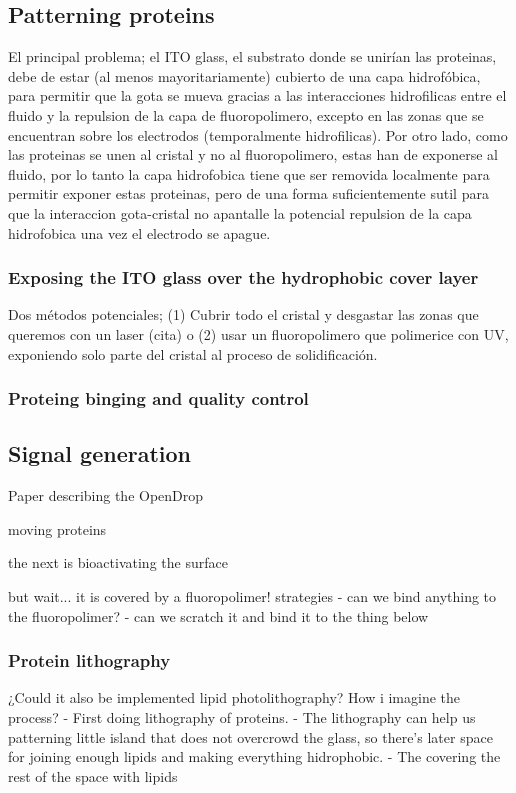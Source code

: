 \documentclass[12pt]{article}
\begin{document}
\subsection*{Patterning proteins}
El principal problema; el ITO glass, el substrato donde se unirían las proteinas, debe de estar (al menos mayoritariamente) cubierto de una capa hidrofóbica, para permitir que la gota se mueva gracias a las interacciones hidrofilicas entre el fluido y la repulsion de la capa de fluoropolimero, excepto en las zonas que se encuentran sobre los electrodos (temporalmente hidrofilicas). Por otro lado, como las proteinas se unen al cristal y no al fluoropolimero, estas han de exponerse al fluido, por lo tanto la capa hidrofobica tiene que ser removida localmente para permitir exponer estas proteinas, pero de una forma suficientemente sutil para que la interaccion gota-cristal no apantalle la potencial repulsion de la capa hidrofobica una vez el electrodo se apague.

\subsubsection*{Exposing the ITO glass over the hydrophobic cover layer}
Dos métodos potenciales; (1) Cubrir todo el cristal y desgastar las zonas que queremos con un laser (cita) o (2) usar un fluoropolimero que polimerice con UV, exponiendo solo parte del cristal al proceso de solidificación.
\subsubsection*{Proteing binging and quality control}
\subsection*{Signal generation}

Paper describing the OpenDrop

moving proteins

\cite{strale_multiprotein_2016}

the next is bioactivating the surface

but wait... it is covered by a fluoropolimer!
strategies
 - can we bind anything to the fluoropolimer?
  - can we scratch it and bind it to the thing below


\subsubsection*{Protein lithography}
¿Could it also be implemented lipid photolithography?
How i imagine the process?
 - First doing lithography of proteins. 
      - The lithography can help us patterning little island that does not overcrowd the glass, so there's later space for joining enough lipids and making everything hidrophobic.
 - The covering the rest of the space with lipids
\end{document}
